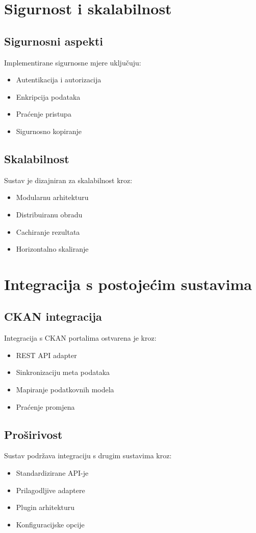 \section{Sigurnost i skalabilnost}
\label{sec:security_scalability}

\subsection{Sigurnosni aspekti}
Implementirane sigurnosne mjere uključuju:
\begin{itemize}
    \item Autentikacija i autorizacija
    \item Enkripcija podataka
    \item Praćenje pristupa
    \item Sigurnosno kopiranje
\end{itemize}

\subsection{Skalabilnost}
Sustav je dizajniran za skalabilnost kroz:
\begin{itemize}
    \item Modularnu arhitekturu
    \item Distribuiranu obradu
    \item Cachiranje rezultata
    \item Horizontalno skaliranje
\end{itemize}

\section{Integracija s postojećim sustavima}
\label{sec:integration}

\subsection{CKAN integracija}
Integracija s CKAN portalima ostvarena je kroz:
\begin{itemize}
    \item REST API adapter
    \item Sinkronizaciju meta podataka
    \item Mapiranje podatkovnih modela
    \item Praćenje promjena
\end{itemize}

\subsection{Proširivost}
Sustav podržava integraciju s drugim sustavima kroz:
\begin{itemize}
    \item Standardizirane API-je
    \item Prilagodljive adaptere
    \item Plugin arhitekturu
    \item Konfiguracijske opcije
\end{itemize} 